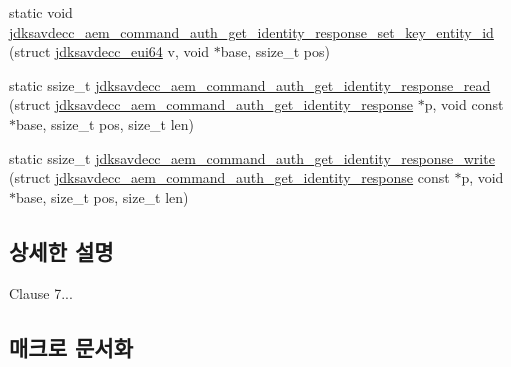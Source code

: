 \begin{DoxyCompactItemize}
\item 
static void \hyperlink{group__command__auth__get__identity__response_ga1e3b43fcd4400c7d81917e97b5afde2b}{jdksavdecc\+\_\+aem\+\_\+command\+\_\+auth\+\_\+get\+\_\+identity\+\_\+response\+\_\+set\+\_\+key\+\_\+entity\+\_\+id} (struct \hyperlink{structjdksavdecc__eui64}{jdksavdecc\+\_\+eui64} v, void $\ast$base, ssize\+\_\+t pos)
\item 
static ssize\+\_\+t \hyperlink{group__command__auth__get__identity__response_gaa8d204ba3be8d84203dca49c7ff27ee7}{jdksavdecc\+\_\+aem\+\_\+command\+\_\+auth\+\_\+get\+\_\+identity\+\_\+response\+\_\+read} (struct \hyperlink{structjdksavdecc__aem__command__auth__get__identity__response}{jdksavdecc\+\_\+aem\+\_\+command\+\_\+auth\+\_\+get\+\_\+identity\+\_\+response} $\ast$p, void const $\ast$base, ssize\+\_\+t pos, size\+\_\+t len)
\item 
static ssize\+\_\+t \hyperlink{group__command__auth__get__identity__response_ga9c3d7dfa24c84a804de2f3cc310d3a9d}{jdksavdecc\+\_\+aem\+\_\+command\+\_\+auth\+\_\+get\+\_\+identity\+\_\+response\+\_\+write} (struct \hyperlink{structjdksavdecc__aem__command__auth__get__identity__response}{jdksavdecc\+\_\+aem\+\_\+command\+\_\+auth\+\_\+get\+\_\+identity\+\_\+response} const $\ast$p, void $\ast$base, size\+\_\+t pos, size\+\_\+t len)
\end{DoxyCompactItemize}


\subsection{상세한 설명}
Clause 7... 

\subsection{매크로 문서화}
